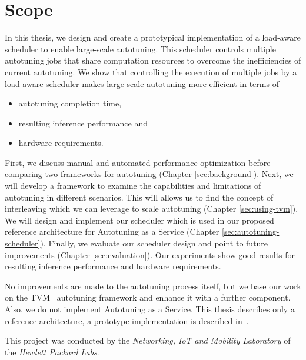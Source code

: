 \section{Scope}
In this thesis, we design and create a prototypical implementation of a load-aware scheduler to enable large-scale autotuning. This scheduler controls multiple autotuning jobs that share computation resources to overcome the inefficiencies of current autotuning. We show that controlling the execution of multiple jobs by a load-aware scheduler makes large-scale autotuning more efficient in terms of
\begin{itemize}
	\item autotuning completion time,
	\item resulting inference performance and
	\item hardware requirements.
\end{itemize}

First, we discuss manual and automated performance optimization before comparing two frameworks for autotuning (Chapter \ref{sec:background}). Next, we will develop a framework to examine the capabilities and limitations of autotuning in different scenarios. This will allows us to find the concept of interleaving which we can leverage to scale autotuning (Chapter \ref{sec:using-tvm}). We will design and implement our scheduler which is used in our proposed reference architecture for Autotuning as a Service (Chapter \ref{sec:autotuning-scheduler}). Finally, we evaluate our scheduler design and point to future improvements (Chapter \ref{sec:evaluation}). Our experiments show good results for resulting inference performance and hardware requirements.

No improvements are made to the autotuning process itself, but we base our work on the TVM~\cite{Chen.2018b} autotuning framework and enhance it with a further component. Also, we do not implement Autotuning as a Service. This thesis describes only a reference architecture, a prototype implementation is described in~\cite{Cho.2019}.

This project was conducted by the \textit{Networking, IoT and Mobility Laboratory} of the \textit{Hewlett Packard Labs}.
